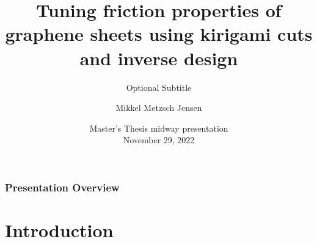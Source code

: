 \documentclass[
	11pt, %
]{beamer}
\title[Short Title]{Tuning friction properties of graphene sheets using kirigami cuts and inverse design} %
\subtitle{Optional Subtitle} %
\author[Mikkel Metzsch Jensen]{Mikkel Metzsch Jensen} %
\institute[UiO]{Universitetet i Oslo} %
\date[\today]{Master's Thesis midway presentation \\ November 29, 2022} %
\begin{document}

\begin{frame}
	\titlepage %
\end{frame}



\begin{frame}
	\frametitle{Presentation Overview} %
	
	\tableofcontents %
\end{frame}



\section{Introduction}
\end{document}
